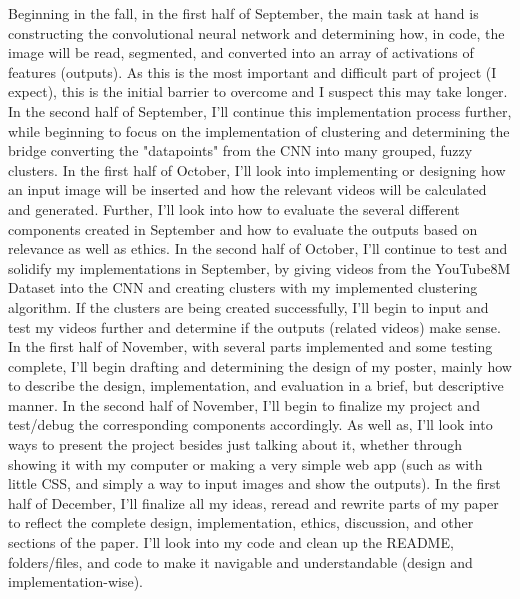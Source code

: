 \documentclass[10pt,twocolumn]{article}
\begin{document}
Beginning in the fall, in the first half of September, the main task at hand is constructing the convolutional neural network and determining how, in code, the image will be read, segmented, and converted into an array of activations of features (outputs). As this is the most important and difficult part of project (I expect), this is the initial barrier to overcome and I suspect this may take longer. In the second half of September, I'll continue this implementation process further, while beginning to focus on the implementation of clustering and determining the bridge converting the "datapoints" from the CNN into many grouped, fuzzy clusters. In the first half of October, I'll look into implementing or designing how an input image will be inserted and how the relevant videos will be calculated and generated. Further, I'll look into how to evaluate the several different components created in September and how to evaluate the outputs based on relevance as well as ethics. In the second half of October, I'll continue to test and solidify my implementations in September, by giving videos from the YouTube8M Dataset into the CNN and creating clusters with my implemented clustering algorithm. If the clusters are being created successfully, I'll begin to input and test my videos further and determine if the outputs (related videos) make sense. In the first half of November, with several parts implemented and some testing complete, I'll begin drafting and determining the design of my poster, mainly how to describe the design, implementation, and evaluation in a brief, but descriptive manner. In the second half of November, I'll begin to finalize my project and test/debug the corresponding components accordingly. As well as, I'll look into ways to present the project besides just talking about it, whether through showing it with my computer or making a very simple web app (such as with little CSS, and simply a way to input images and show the outputs). In the first half of December, I'll finalize all my ideas, reread and rewrite parts of my paper to reflect the complete design, implementation, ethics, discussion, and other sections of the paper. I'll look into my code and clean up the README, folders/files, and code to make it navigable and understandable (design and implementation-wise).  






\printbibliography
\end{document}
